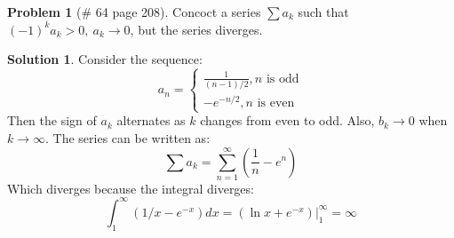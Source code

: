 \documentclass{article}
\theoremstyle{definition}
\newtheorem*{soln}{Solution}
\newtheorem*{prob}{Problem}
\theoremstyle{theorem}
\begin{document}
\begin{prob}[\# 64  page 208]
    Concoct a series $\sum a_k$ such that $(-1)^ka_k>0, \ a_k\to 0$, but the series diverges.
\end{prob}
\begin{soln}
Consider the sequence:
    $$a_n = \begin{cases} \frac{1}{(n-1)/2}, n\text{ is odd}\\
    -e^{-n/2}, n\text{ is even} \end{cases} $$
    Then the sign of $a_k$ alternates as $k$ changes from even to odd. Also, $b_k\to 0$ when $k\to \infty$. The series can be written as:
    $$\sum a_k = \sum_{n=1}^\infty \left( \frac{1}{n} - e^{n}\right)$$
    Which diverges because the integral diverges:
    $$\int_1^\infty \left( 1/x -e^{-x}\right)dx = \left. \left( \ln x +e^{-x}\right)\right|_1^\infty= \infty $$
\end{soln}
\vspace{1in}
\end{document}
